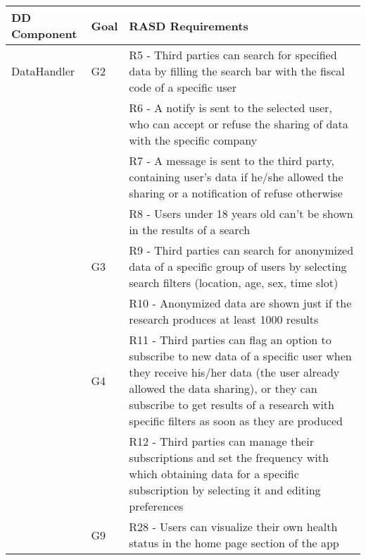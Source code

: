 \begin{table}[]
\begin{adjustbox}{width=\textwidth}
\begin{tabular}{|p{}|p{}|p{}|}
\hline
\textbf{DD Component} & \textbf{Goal} & \textbf{RASD Requirements}\\ \hline					
DataHandler			& G2	& R5 - Third parties can search for specified data by filling the search bar with the fiscal code of a specific user	\\
					&		& R6 -	A notify is sent to the selected user, who can accept or refuse the sharing of data with the specific company\\
					&		& R7 - A message is sent to the third party, containing user's data if he/she allowed the sharing or a notification of refuse otherwise	\\
					&		& R8 - Users under 18 years old can't be shown in the results of a search	\\
					& G3	& R9 - Third parties can search for anonymized data of a specific group of users by selecting search filters (location, age, sex, time slot)	\\
					&		& R10 - Anonymized data are shown just if the research produces at least 1000 results	\\
					& G4	& R11 -	Third parties can flag an option to subscribe to new data of a specific user when they receive his/her data (the user already allowed the data sharing), or they can subscribe to get results of a research with specific filters as soon as they are produced\\
					&		& R12 - Third parties can manage their subscriptions and set the frequency with which obtaining data for a specific subscription by selecting it and editing preferences	\\
					& G9	& R28 - Users can visualize their own health status in the home page section of the app	\\ \hline
\end{tabular}
\end{adjustbox}
\end{table}

